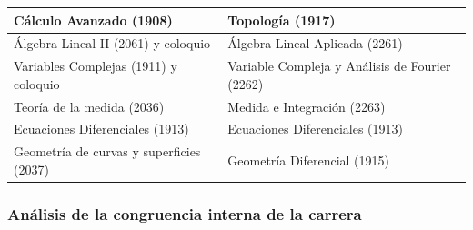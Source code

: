 \documentclass[a4paper, 12pt]{article}
\begin{document}
\begin{center}
\begin{tabular}{|l|l|}
Cálculo Avanzado         (1908)                 &Topología   (1917)       \\
\hline

Álgebra Lineal II (2061)  y coloquio      & Álgebra Lineal Aplicada (2261)       \\\hline

Variables Complejas (1911) y coloquio                & Variable Compleja y Análisis de Fourier (2262) \\
\hline

Teoría de la medida (2036)     & Medida e Integración (2263) \\
\hline

Ecuaciones Diferenciales    (1913)     &Ecuaciones Diferenciales (1913)   \\
\hline

Geometría de curvas y superficies  (2037)  & Geometría Diferencial (1915)
\\\hline

\end{tabular}
\end{center}

\normalfont
\newpage


\subsubsection{Análisis de la congruencia interna de la carrera}
\end{document}
